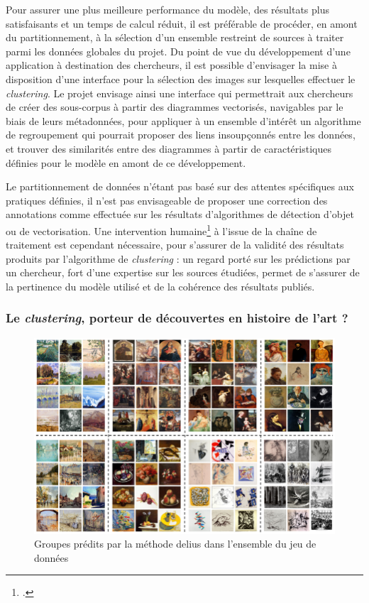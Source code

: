     Pour assurer une plus meilleure performance du modèle, des résultats plus satisfaisants et un temps de calcul réduit, il est préférable de procéder, en amont du partitionnement, à la sélection d'un ensemble restreint de sources à traiter parmi les données globales du projet. Du point de vue du développement d'une application à destination des chercheurs, il est possible d'envisager la mise à disposition d'une interface pour la sélection des images sur lesquelles effectuer le \textit{clustering}. Le projet \eida envisage ainsi une interface qui permettrait aux chercheurs de créer des sous-corpus à partir des diagrammes vectorisés, navigables par le biais de leurs métadonnées, pour appliquer à un ensemble d'intérêt un algorithme de regroupement qui pourrait proposer des liens insoupçonnés entre les données, et trouver des similarités entre des diagrammes à partir de caractéristiques définies pour le modèle en amont de ce développement.
    
    Le partitionnement de données n'étant pas basé sur des attentes spécifiques aux pratiques définies, il n'est pas envisageable de proposer une correction des annotations comme effectuée sur les résultats d'algorithmes de détection d'objet ou de vectorisation. Une intervention humaine\footcite{deluaSupervisedVsUnsupervised2021} à l'issue de la chaîne de traitement est cependant nécessaire, pour s'assurer de la validité des résultats produits par l'algorithme de \textit{clustering} : un regard porté sur les prédictions par un chercheur, fort d'une expertise sur les sources étudiées, permet de s'assurer de la pertinence du modèle utilisé et de la cohérence des résultats publiés.
    
    \subsubsection{Le \textit{clustering}, porteur de découvertes en histoire de l'art ?}
    
    \begin{figure}[h]
    	\centering
    	\includegraphics[width=14cm]{images/delius_global_clusters.png}
    	\caption{Groupes prédits par la méthode \acrshort{delius} dans l'ensemble du jeu de données}
    	\label{fig:delius_global_clusters}
    \end{figure}

